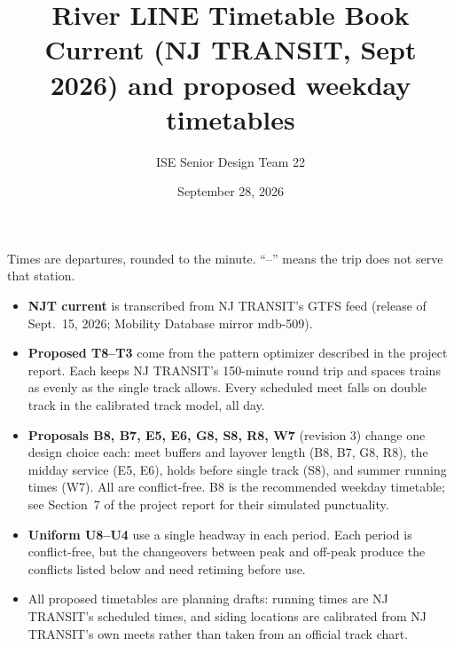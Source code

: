 \documentclass[10pt,landscape]{article}
\title{River LINE Timetable Book\\\large Current (NJ TRANSIT, Sept 2026) and proposed weekday timetables}
\author{ISE Senior Design Team 22}
\date{September 28, 2026}
\begin{document}
\maketitle
\noindent Times are departures, rounded to the minute. ``--'' means the trip does not serve that station.
\begin{itemize}
\item \textbf{NJT current} is transcribed from NJ TRANSIT's GTFS feed (release of Sept.~15, 2026; Mobility Database mirror mdb-509).
\item \textbf{Proposed T8--T3} come from the pattern optimizer described in the project report. Each keeps NJ TRANSIT's 150-minute round trip and spaces trains as evenly as the single track allows. Every scheduled meet falls on double track in the calibrated track model, all day.
\item \textbf{Proposals B8, B7, E5, E6, G8, S8, R8, W7} (revision 3) change one design choice each: meet buffers and layover length (B8, B7, G8, R8), the midday service (E5, E6), holds before single track (S8), and summer running times (W7). All are conflict-free. B8 is the recommended weekday timetable; see Section~7 of the project report for their simulated punctuality.
\item \textbf{Uniform U8--U4} use a single headway in each period. Each period is conflict-free, but the changeovers between peak and off-peak produce the conflicts listed below and need retiming before use.
\item All proposed timetables are planning drafts: running times are NJ TRANSIT's scheduled times, and siding locations are calibrated from NJ TRANSIT's own meets rather than taken from an official track chart.
\end{itemize}
\end{document}
